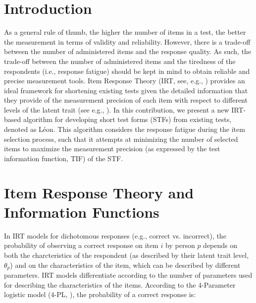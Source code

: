 \documentclass{svproc}
\begin{document}
\section{Introduction}
%
As a general rule of thumb, the higher the number of items in a test, the better the measurement in terms of validity and reliability. However, there is a trade-off between the number of administered items and the response quality. As such, the trade-off between the number of administered items and the tiredness of the respondents (i.e., response fatigue) should be kept in mind to obtain reliable and precise measurement tools. Item Response Theory (IRT, see, e.g., \cite{baker}) provides an ideal framework for shortening existing tests given the detailed information that they provide of the measurement precision of each item with respect to different levels of the latent trait (see e.g., \cite{pauci}). 
In this contribution, we present a new IRT-based algorithm for developing short test forms (STFs) from existing tests, denoted as Léon. This algorithm considers the response fatigue during the item selection process, such that it attempts at minimizing the number of selected items to maximize the measurement precision (as expressed by the test information function, TIF) of the STF.

\section{Item Response Theory and Information Functions}  

In IRT models for dichotomous responses (e.g., correct vs. incorrect), the probability of observing a correct response on item $i$ by person $p$ depends on both the charcteristics of the respondent (as described by their latent trait level, $\theta_p$) and on the characteristics of the item, which can be described by different parameters. IRT models differentiate according to the number of parameters used for describing the characteristics of the items. According to the 4-Parameter logistic model (4-PL, \cite{barton:4pl}), the probability of a correct response is: 
\end{document}
